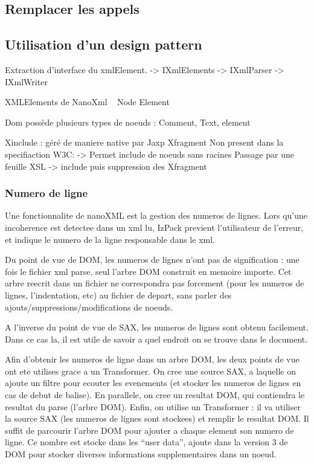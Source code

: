 \subsection{Remplacer les appels}
\subsection{Utilisation d'un design pattern}
Extraction d'interface du xmlElement.
-> IXmlElements
-> IXmlParser
-> IXmlWriter

XMLElements de NanoXml ~ Node Element

Dom possède plusieurs types de noeuds : Comment, Text, element

Xinclude : géré de maniere native par Jaxp
Xfragment Non present dans la specifiaction W3C:
-> Permet include de noeuds sans racines
Passage par une feuille XSL
-> include puis suppression des Xfragment

\subsubsection{Numero de ligne}
Une fonctionnalite de nanoXML est la gestion des numeros de lignes. Lors qu'une incoherence est detectee dans un xml lu, IzPack previent l'utilisateur de l'erreur, et indique le numero de la ligne responsable dans le xml.

Du point de vue de DOM, les numeros de lignes n'ont pas de signification : une fois le fichier xml parse, seul l'arbre DOM construit en memoire importe. Cet arbre reecrit dans un fichier ne correspondra pas forcement (pour les numeros de lignes, l'indentation, etc) au fichier de depart, sans parler des ajouts/suppressions/modifications de noeuds.

A l'inverse du point de vue de SAX, les numeros de lignes sont obtenu facilement. Dans ce cas la, il est utile de savoir a quel endroit on se trouve dans le document.

Afin d'obtenir les numeros de ligne dans un arbre DOM, les deux points de vue ont ete utilises grace a un Transformer.
On cree une source SAX, a laquelle on ajoute un filtre pour ecouter les evenements (et stocker les numeros de lignes en cas de debut de balise).
En parallele, on cree un resultat DOM, qui contiendra le resultat du parse (l'arbre DOM).
Enfin, on utilise un Transformer : il va utiliser la source SAX (les numeros de lignes sont stockees) et remplir le resultat DOM.
Il suffit de parcourir l'arbre DOM pour ajouter a chaque element son numero de ligne.
Ce nombre est stocke dans les ``user data'', ajoute dans la version 3  de DOM pour stocker diverses informations supplementaires dans un noeud.


